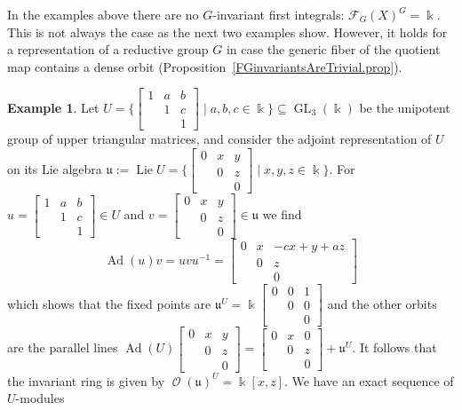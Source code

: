 \documentclass{amsart}
\theoremstyle{definition}
\newtheorem{exa}[thm]{Example}
\theoremstyle{remark}
\begin{document}
In the examples above there are no $G$-invariant first integrals: ${\mathcal F}_{G}(X)^{G}={\Bbbk}$. This is not always the case as the next two examples show. However, it holds for a representation of a reductive group $G$ in case the generic fiber of the quotient map contains a dense orbit (Proposition~\ref{FGinvariantsAreTrivial.prop}).

\begin{exa} Let $U=\{{\left[\begin{smallmatrix}1&a&b\\&1&c\\&&1\end{smallmatrix}\right]}\mid a,b,c\in{\Bbbk}\}{\subseteq}\operatorname{GL}_{3}({\Bbbk})$ be the unipotent group of upper triangular matrices, and consider the adjoint representation of $U$ on its Lie algebra ${\mathfrak u}:=\operatorname{Lie} U =  \{{\left[\begin{smallmatrix}0&x&y\\&0&z\\&&0\end{smallmatrix}\right]}\mid x,y,z\in{\Bbbk}\}$. For $u={\left[\begin{smallmatrix}1&a&b\\&1&c\\&&1\end{smallmatrix}\right]} \in U$ and $v={\left[\begin{smallmatrix}0&x&y\\&0&z\\&&0\end{smallmatrix}\right]} \in {\mathfrak u}$ we find
\[\tag{$**$}
\operatorname{Ad}(u) v = u v u^{-1} = \begin{bmatrix} 0 & x & -c x + y + a z\\ &0&z\\&&0\end{bmatrix}
\]
which shows that the fixed points are ${\mathfrak u}^{U}={\Bbbk}{\left[\begin{smallmatrix}0&0&1\\&0&0\\&&0\end{smallmatrix}\right]}$ and the other orbits are the parallel lines $\operatorname{Ad}(U){\left[\begin{smallmatrix}0&x&y\\&0&z\\&&0\end{smallmatrix}\right]} ={\left[\begin{smallmatrix}0&x&0\\&0&z\\&&0\end{smallmatrix}\right]}+{\mathfrak u}^{U}$. It follows that the invariant ring is given by $\operatorname{\mathcal O}({\mathfrak u})^{U}={\Bbbk}[x,z]$. We have an exact sequence of $U$-modules

\end{exa}
\end{document}
